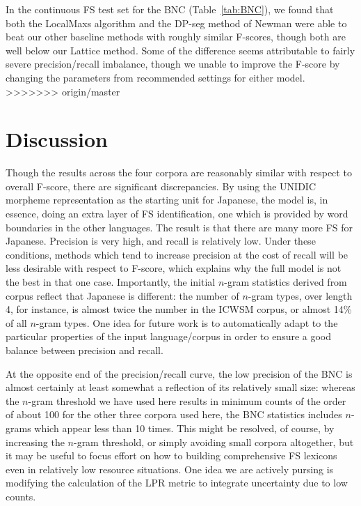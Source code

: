 \documentclass[11pt,letterpaper]{article}
\newcommand{\tabref}[2][]{Table#1~\ref{#2}\xspace}
\begin{document}
In the continuous FS test set for the BNC (\tabref{tab:BNC}), we found that both the LocalMaxs algorithm and the DP-seg method of Newman \cite{Newman12} were able to beat our other baseline methods with roughly similar F-scores, though both are well below our Lattice method. Some of the difference seems attributable to fairly severe precision/recall imbalance, though we unable to improve the F-score by changing the parameters from recommended settings for either model.
>>>>>>> origin/master


\section{Discussion} \label{sec:discussion}

Though the results across the four corpora are reasonably similar with respect to overall F-score, there are significant discrepancies. By using the UNIDIC morpheme representation as the starting unit for Japanese, the model is, in essence, doing an extra layer of FS identification, one which is provided by word boundaries in the other languages. The result is that there are many more FS for Japanese. Precision is very high, and recall is relatively low. Under these conditions, methods which tend to increase precision at the cost of recall will be less desirable with respect to F-score, which explains why the full model is not the best in that one case.  Importantly, the initial $n$-gram statistics derived from corpus reflect that Japanese is different: the number of $n$-gram types, over length 4, for instance, is almost twice the number in the ICWSM corpus, or almost 14\% of all $n$-gram types. One idea for future work is to automatically adapt to the particular properties of the input language/corpus in order to ensure a good balance between precision and recall.

At the opposite end of the precision/recall curve, the low precision of the BNC is almost certainly at least somewhat a reflection of its relatively small size: whereas the $n$-gram threshold we have used here results in minimum counts of the order of about 100 for the other three corpora used here, the BNC statistics includes $n$-grams which appear less than 10 times. This might be resolved, of course, by increasing the $n$-gram threshold, or simply avoiding small corpora altogether, but it may be useful to focus effort on how to building comprehensive FS lexicons even in relatively low resource situations. One idea we are actively pursing is modifying the calculation of the LPR metric to integrate uncertainty due to low counts.
\end{document}
